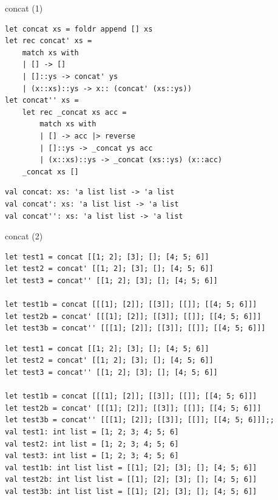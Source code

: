 \documentclass[t]{beamer}
\begin{document}
\begin{frame}[label={sec:org93acaf8},fragile]{concat (1)}
 \begin{verbatim}
let concat xs = foldr append [] xs
let rec concat' xs = 
    match xs with
    | [] -> []
    | []::ys -> concat' ys
    | (x::xs)::ys -> x:: (concat' (xs::ys))
let concat'' xs =
    let rec _concat xs acc = 
        match xs with
        | [] -> acc |> reverse
        | []::ys -> _concat ys acc
        | (x::xs)::ys -> _concat (xs::ys) (x::acc)
    _concat xs []
\end{verbatim}

\begin{verbatim}
val concat: xs: 'a list list -> 'a list
val concat': xs: 'a list list -> 'a list
val concat'': xs: 'a list list -> 'a list
\end{verbatim}
\end{frame}

\begin{frame}[label={sec:org03c79a4},fragile]{concat (2)}
 \begin{verbatim}
let test1 = concat [[1; 2]; [3]; []; [4; 5; 6]]
let test2 = concat' [[1; 2]; [3]; []; [4; 5; 6]]
let test3 = concat'' [[1; 2]; [3]; []; [4; 5; 6]]

let test1b = concat [[[1]; [2]]; [[3]]; [[]]; [[4; 5; 6]]]
let test2b = concat' [[[1]; [2]]; [[3]]; [[]]; [[4; 5; 6]]] 
let test3b = concat'' [[[1]; [2]]; [[3]]; [[]]; [[4; 5; 6]]] 
\end{verbatim}

\begin{verbatim}
let test1 = concat [[1; 2]; [3]; []; [4; 5; 6]]
let test2 = concat' [[1; 2]; [3]; []; [4; 5; 6]]
let test3 = concat'' [[1; 2]; [3]; []; [4; 5; 6]]

let test1b = concat [[[1]; [2]]; [[3]]; [[]]; [[4; 5; 6]]]
let test2b = concat' [[[1]; [2]]; [[3]]; [[]]; [[4; 5; 6]]] 
let test3b = concat'' [[[1]; [2]]; [[3]]; [[]]; [[4; 5; 6]]];;
val test1: int list = [1; 2; 3; 4; 5; 6]
val test2: int list = [1; 2; 3; 4; 5; 6]
val test3: int list = [1; 2; 3; 4; 5; 6]
val test1b: int list list = [[1]; [2]; [3]; []; [4; 5; 6]]
val test2b: int list list = [[1]; [2]; [3]; []; [4; 5; 6]]
val test3b: int list list = [[1]; [2]; [3]; []; [4; 5; 6]]
\end{verbatim}
\end{frame}
\end{document}

